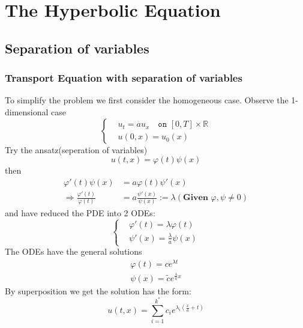   

\section{The Hyperbolic Equation}
\subsection{Separation of variables}
\subsubsection{Transport Equation with separation of variables}
To simplify the problem we first consider the homogeneous case. Observe the 1-dimensional case
\begin{equation*}
\left\{
\begin{aligned}
	&u_t = a u_x \quad \texttt{on } [0, T] \times \mathbb{R} \\
	&u(0, x) = u_0(x)
\end{aligned}
\right.
\end{equation*}
Try the ansatz(seperation of variables) 
\begin{equation*}
	u(t, x) = \varphi(t) \psi(x)
\end{equation*}
then
\begin{align*}
	\varphi'(t) \psi(x) &= a\varphi(t) \psi'(x)\\
	\Rightarrow \frac{\varphi'(t)}{\varphi(t)} &= a\frac{\psi'(x)}{\psi(x)} := \lambda (\textbf{Given } \varphi, \psi \neq 0)
\end{align*}
and have reduced the PDE into 2 ODEs:
\begin{equation*}
	\left\{
	\begin{aligned}
		&\varphi'(t) = \lambda \varphi(t)\\
		&\psi'(x) = \frac{\lambda}{a} \psi(x) 
	\end{aligned}
	\right.
\end{equation*}
The ODEs have the general solutions 
\begin{equation*}
	\begin{aligned}
		\varphi(t) = c e^{\lambda t}\\
		\psi(x) = \tilde{c} e^{\frac{\lambda}{a} x}
	\end{aligned}
\end{equation*}
By superposition we get the solution has the form:
\begin{equation*}
	u(t, x) = \sum_{i = 1}^{k^*} c_i e^{\lambda_i(\frac{x}{a} + t)}
\end{equation*}
